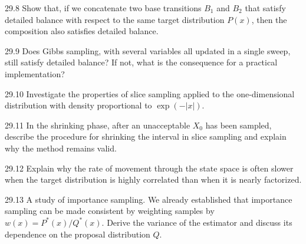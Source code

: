 \documentclass[12pt, a4paper]{article}
\begin{document}
\begin{prob}{29.8}
Show that, if we concatenate two base transitions $B_1$ and $B_2$ that satisfy detailed balance with respect to the same target distribution $P(x)$, then the composition also satisfies detailed balance.
\end{prob}
\begin{sol}
\end{sol}
\bigskip

\begin{prob}{29.9}
Does Gibbs sampling, with several variables all updated in a single sweep, still satisfy detailed balance? If not, what is the consequence for a practical implementation?
\end{prob}
\begin{sol}
\end{sol}
\bigskip

\begin{prob}{29.10}
Investigate the properties of slice sampling applied to the one-dimensional distribution with density proportional to $\exp(-|x|)$.
\end{prob}
\begin{sol}
\end{sol}
\bigskip

\begin{prob}{29.11}
In the shrinking phase, after an unacceptable $X_0$ has been sampled, describe the procedure for shrinking the interval in slice sampling and explain why the method remains valid.
\end{prob}
\begin{sol}
\end{sol}
\bigskip

\begin{prob}{29.12}
Explain why the rate of movement through the state space is often slower when the target distribution is highly correlated than when it is nearly factorized.
\end{prob}
\begin{sol}
\end{sol}
\bigskip

\begin{prob}{29.13}
A study of importance sampling. We already established that importance sampling can be made consistent by weighting samples by $w(x)=P^\ast(x)/Q^\ast(x)$. Derive the variance of the estimator and discuss its dependence on the proposal distribution $Q$.
\end{prob}
\begin{sol}
\end{sol}
\bigskip
\end{document}
